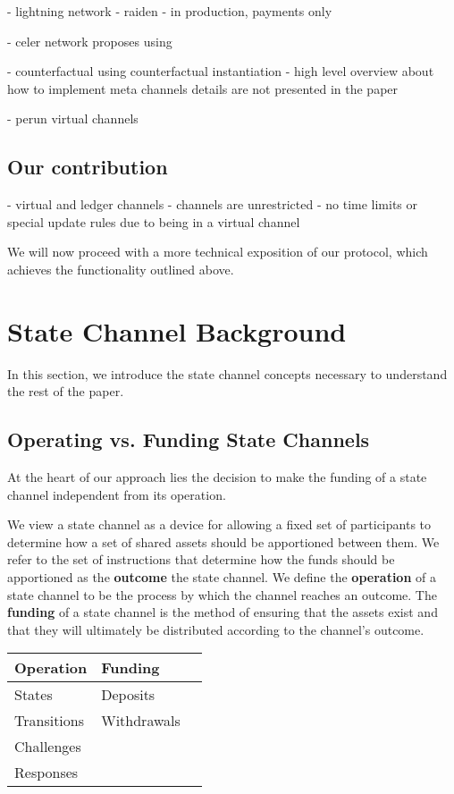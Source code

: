 \documentclass{article}
\begin{document}
- lightning network
- raiden
- in production, payments only

- celer network proposes using 

- counterfactual using counterfactual instantiation
- high level overview about how to implement meta channels details are not presented in the paper

- perun virtual channels



\subsection{Our contribution}

- virtual and ledger channels
- channels are unrestricted
- no time limits or special update rules due to being in a virtual channel

We will now proceed with a more technical exposition of our protocol, which achieves the functionality outlined above.

\section{State Channel Background}

In this section, we introduce the state channel concepts necessary to understand the rest of the paper.

\subsection{Operating vs. Funding State Channels}

At the heart of our approach lies the decision to make the funding of a state channel independent from its operation.

We view a state channel as a device for allowing a fixed set of participants to determine how a set of shared assets should be apportioned between them.
We refer to the set of instructions that determine how the funds should be apportioned as the  \textbf{outcome} the state channel.
We define the \textbf{operation} of a state channel to be the process by which the channel reaches an outcome. 
The \textbf{funding} of a state channel is the method of ensuring that the assets exist and that they will ultimately be distributed according to the channel's outcome.

\begin{table}[]
  \begin{tabular}{|l|l|l|}
  \hline
  \textbf{Operation} & \textbf{Funding} \\ \hline
  States &        Deposits \\ 
  Transitions &   Withdrawals \\ 
  Challenges &     \\ 
  Responses &    \\ \hline
  \end{tabular}
  \end{table}
\end{document}
